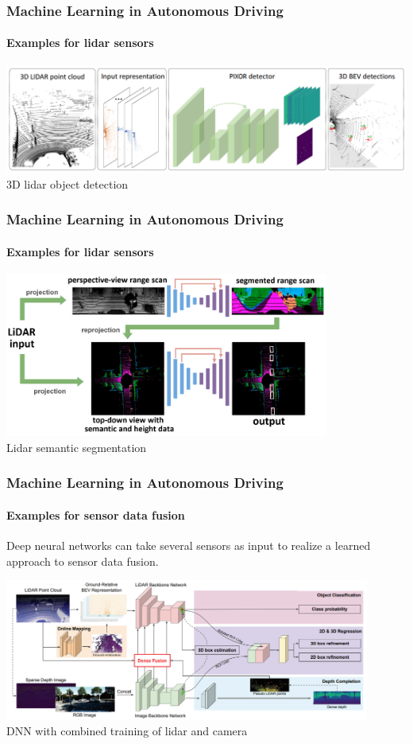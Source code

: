 \begin{frame}
\frametitle{Machine Learning in Autonomous Driving}
\framesubtitle{Examples for lidar sensors}
\centering
\includegraphics[width=\textwidth]{images/pixor_lidar_object_detection.png}\\
\footnotesize{3D lidar object detection \cite{Yang2018}}
\end{frame}

\begin{frame}
\frametitle{Machine Learning in Autonomous Driving}
\framesubtitle{Examples for lidar sensors}
\centering
\includegraphics[width=0.8\textwidth]{images/nvidia_lidar_semantic_segmentation.png}\\
\vspace{0.2cm}
\footnotesize{Lidar semantic segmentation \cite{Chen2020}}
\end{frame}

\begin{frame}
\frametitle{Machine Learning in Autonomous Driving}
\framesubtitle{Examples for sensor data fusion}
Deep neural networks can take several sensors as input to realize a learned
approach to sensor data fusion.
\begin{center}
\includegraphics[width=0.9\textwidth]{images/uber_dnn_sensor_fusion.png}\\
\vspace{0.1cm}
\footnotesize{DNN with combined training of lidar and camera \cite{Liang2019}}
\end{center}
\end{frame}

